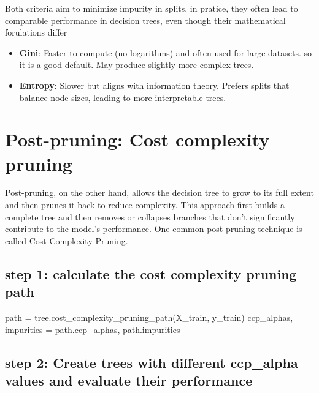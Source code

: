 \documentclass[
  letterpaper,
  DIV=11,
  numbers=noendperiod]{scrreprt}
\newenvironment{Shaded}{\begin{snugshade}}{\end{snugshade}}
\newcommand{\NormalTok}[1]{\textcolor[rgb]{0.00,0.23,0.31}{#1}}
\newcommand{\OperatorTok}[1]{\textcolor[rgb]{0.37,0.37,0.37}{#1}}
\providecommand{\tightlist}{%
  \setlength{\itemsep}{0pt}\setlength{\parskip}{0pt}}\usepackage{longtable,booktabs,array}
\begin{document}
Both criteria aim to minimize impurity in splits, in pratice, they often
lead to comparable performance in decision trees, even though their
mathematical forulations differ

\begin{itemize}
\tightlist
\item
  \textbf{Gini}: Faster to compute (no logarithms) and often used for
  large datasets. so it is a good default. May produce slightly more
  complex trees.
\item
  \textbf{Entropy}: Slower but aligns with information theory. Prefers
  splits that balance node sizes, leading to more interpretable trees.
\end{itemize}

\section{Post-pruning: Cost complexity
pruning}\label{post-pruning-cost-complexity-pruning}

Post-pruning, on the other hand, allows the decision tree to grow to its
full extent and then prunes it back to reduce complexity. This approach
first builds a complete tree and then removes or collapses branches that
don't significantly contribute to the model's performance. One common
post-pruning technique is called Cost-Complexity Pruning.

\subsection{step 1: calculate the cost complexity pruning
path}\label{step-1-calculate-the-cost-complexity-pruning-path}

\begin{Shaded}
\begin{Highlighting}[]
\NormalTok{path }\OperatorTok{=}\NormalTok{ tree.cost\_complexity\_pruning\_path(X\_train, y\_train)}
\NormalTok{ccp\_alphas, impurities }\OperatorTok{=}\NormalTok{ path.ccp\_alphas, path.impurities}
\end{Highlighting}
\end{Shaded}

\subsection{step 2: Create trees with different ccp\_alpha values and
evaluate their
performance}\label{step-2-create-trees-with-different-ccp_alpha-values-and-evaluate-their-performance}
\end{document}
